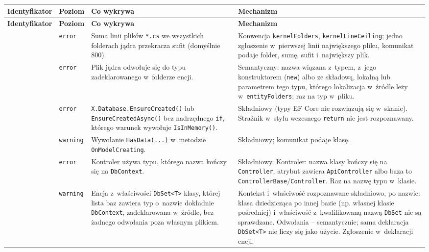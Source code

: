 \begin{xltabular}{\linewidth}{@{}>{\raggedright\arraybackslash}p{4.3cm} >{\raggedright\arraybackslash}p{1.25cm} >{\raggedright\arraybackslash}X >{\raggedright\arraybackslash}X@{}}
\toprule
\textbf{Identyfikator} & \textbf{Poziom} & \textbf{Co wykrywa} & \textbf{Mechanizm} \\
\midrule
\endfirsthead
\toprule
\textbf{Identyfikator} & \textbf{Poziom} & \textbf{Co wykrywa} & \textbf{Mechanizm} \\
\midrule
\endhead
{} & \texttt{error} & Suma linii plików \texttt{*.cs} we wszystkich folderach jądra przekracza sufit (domyślnie 800). & Konwencja \texttt{kernelFolders}, \texttt{kernelLineCeiling}; jedno zgłoszenie w~pierwszej linii największego pliku, komunikat podaje folder, sumę, sufit i~największy plik. \\
 & \texttt{error} & Plik jądra odwołuje się do typu zadeklarowanego w~folderze encji. & Semantyczny: nazwa wiązana z~typem, z~jego konstruktorem (\texttt{new}) albo ze składową, lokalną lub parametrem tego typu, którego lokalizacja w~źródle leży w~\texttt{entityFolders}; raz na typ w~pliku. \\
 & \texttt{error} & \texttt{X.Database.EnsureCreated()} lub \texttt{EnsureCreatedAsync()} bez nadrzędnego \texttt{if}, którego warunek wywołuje \texttt{IsInMemory()}. & Składniowy (typy EF Core nie rozwiązują się w~skanie). Strażnik w~stylu wczesnego \texttt{return} nie jest rozpoznawany. \\
 & \texttt{warning} & Wywołanie \texttt{HasData(...)} w~metodzie \texttt{OnModelCreating}. & Składniowy; komunikat podaje klasę. \\
 & \texttt{error} & Kontroler używa typu, którego nazwa kończy się na \texttt{DbContext}. & Składniowy. Kontroler: nazwa klasy kończy się na \texttt{Controller}, atrybut zawiera \texttt{ApiController} albo baza to \texttt{ControllerBase}/\texttt{Controller}. Raz na nazwę typu w~klasie. \\
 & \texttt{warning} & Encja z~właściwości \texttt{DbSet<T>} klasy, której lista baz zawiera typ o~nazwie dokładnie \texttt{DbContext}, zadeklarowana w~źródle, bez żadnego odwołania poza własnym plikiem. & Kontekst i~właściwość rozpoznawane składniowo, po nazwie: klasa dziedzicząca po innej bazie (np. własnej klasie pośredniej) i~właściwość z~kwalifikowaną nazwą \texttt{DbSet} nie są sprawdzane. Odwołania -- semantycznie; sama deklaracja \texttt{DbSet<T>} nie liczy się jako użycie. Zgłoszenie w~deklaracji encji. \\

\end{xltabular}
